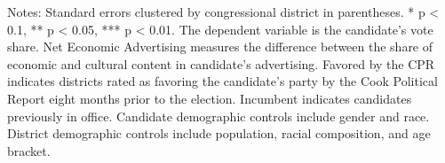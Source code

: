 \begin{table}[htbp]
   \par \raggedright 
   \footnotesize Notes: Standard errors clustered by congressional district in parentheses. * p < 0.1, ** p < 0.05, *** p < 0.01. The dependent variable is the candidate's vote share. Net Economic Advertising measures the difference between the share of economic and cultural content in candidate's advertising. Favored by the CPR indicates districts rated as favoring the candidate's party by the Cook Political Report eight months prior to the election. Incumbent indicates candidates previously in office. Candidate demographic controls include gender and race. District demographic controls include population, racial composition, and age bracket.
\end{table}


